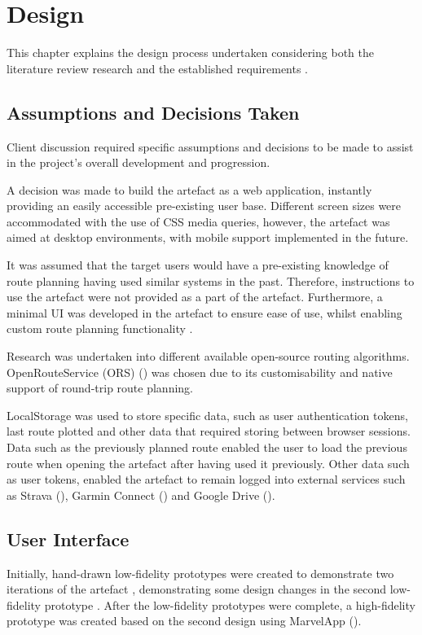 \chapter{Design}
\label{chap:design}

This chapter explains the design process undertaken considering both the literature review research  and the established requirements .
\section{Assumptions and Decisions Taken}
\label{design:assumptions/decisions}

Client discussion required specific assumptions and decisions to be made to assist in the project's overall development and progression.

A decision was made to build the artefact as a web application, instantly providing an easily accessible pre-existing user base. Different screen sizes were accommodated with the use of CSS media queries, however, the artefact was aimed at desktop environments, with mobile support implemented in the future. 

It was assumed that the target users would have a pre-existing knowledge of route planning having used similar systems in the past. Therefore, instructions to use the artefact were not provided as a part of the artefact. Furthermore, a minimal UI was developed in the artefact to ensure ease of use, whilst enabling custom route planning functionality .

Research was undertaken into different available open-source routing algorithms. OpenRouteService (ORS) (\cite{noauthor_openrouteservice_nodate}) was chosen due to its customisability and native support of round-trip route planning.

LocalStorage was used to store specific data, such as user authentication tokens, last route plotted and other data that required storing between browser sessions. Data such as the previously planned route enabled the user to load the previous route when opening the artefact after having used it previously. Other data such as user tokens, enabled the artefact to remain logged into external services such as Strava (\cite{noauthor_strava_nodate}), Garmin Connect (\cite{international_garmin_nodate}) and Google Drive (\cite{noauthor_home_nodate}).

\section{User Interface}
\label{design:ui}
Initially, hand-drawn low-fidelity prototypes were created to demonstrate two iterations of the artefact , demonstrating some design changes in the second low-fidelity prototype . After the low-fidelity prototypes were complete, a high-fidelity prototype was created based on the second design using MarvelApp (\cite{noauthor_marvel_nodate}).

